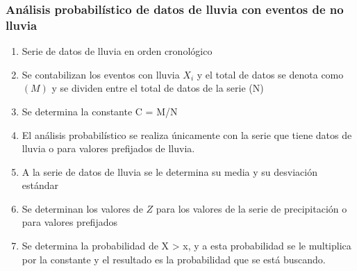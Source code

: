     \subsubsection{Análisis probabilístico de datos de lluvia con eventos de no lluvia}
\begin{enumerate}
    \item Serie de datos de lluvia en orden cronológico 
    \item Se contabilizan los eventos con lluvia $X_i$ y el total de datos se denota como $(M)$ y se dividen entre el total de datos de la serie (N) 
    \item Se determina la constante C = M/N 
    \item El análisis probabilístico se realiza únicamente con la serie que tiene datos de lluvia o para valores prefijados de lluvia. 
    \item A la serie de datos de lluvia se le determina su media y su desviación estándar 
    \item Se determinan los valores de $Z$ para los valores de la serie de precipitación o para valores prefijados 
    \item Se determina la probabilidad de X > x, y a esta probabilidad se le multiplica por la constante y el resultado es la probabilidad que se está buscando.
\end{enumerate}

